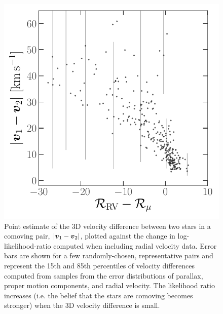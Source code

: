 \documentclass[modern, letterpaper]{aastex61}
\begin{document}
\begin{figure}[htbp]
  \begin{center}
    \includegraphics[width=0.5\linewidth]{llr-vs-dv.pdf}
  \end{center}
  \caption{%
    Point estimate of the 3D velocity difference between two stars in a comoving
    pair, $|\boldsymbol{v}_1 - \boldsymbol{v}_2|$, plotted against the change in
    log-likelihood-ratio computed when including radial velocity data.
    Error bars are shown for a few randomly-chosen, representative pairs and
    represent the 15th and 85th percentiles of velocity differences computed
    from samples from the error distributions of parallax, proper motion
    components, and radial velocity.
    The likelihood ratio increases (i.e. the belief that the stars are comoving
    becomes stronger) when the 3D velocity difference is small.
    \label{fig:llr}}
\end{figure}
\end{document}
